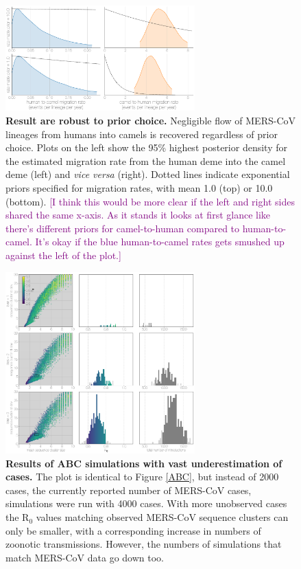 \documentclass[11pt,oneside,letterpaper]{article}
\def\tbc#1{\textcolor{purple}{[#1]}}
\begin{document}
\begin{figure}[h]
\centering
	\includegraphics[width=0.65\textwidth]{figures/mers_prior.png}
	\caption{\textbf{Result are robust to prior choice.}
Negligible flow of MERS-CoV lineages from humans into camels is recovered regardless of prior choice.
Plots on the left show the 95\% highest posterior density for the estimated migration rate from the human deme into the camel deme (left) and \textit{vice versa} (right).
Dotted lines indicate exponential priors specified for migration rates, with mean 1.0 (top) or 10.0 (bottom).
\tbc{I think this would be more clear if the left and right sides shared the same x-axis. As it stands it looks at first glance like there's different priors for camel-to-human compared to human-to-camel. It's okay if the blue human-to-camel rates gets smushed up against the left of the plot.}
	}
	\label{prior}
\end{figure}

\begin{figure}[h]
\centering
	\includegraphics[width=0.65\textwidth]{figures/mers_epi_4000c.png}
	\caption{\textbf{Results of ABC simulations with vast underestimation of cases.}
The plot is identical to Figure \ref{ABC}, but instead of 2000 cases, the currently reported number of MERS-CoV cases, simulations were run with 4000 cases.
With more unobserved cases the R$_{0}$ values matching observed MERS-CoV sequence clusters can only be smaller, with a corresponding increase in numbers of zoonotic transmissions.
However, the numbers of simulations that match MERS-CoV data go down too.
	}
	\label{extra_cases}
\end{figure}
\end{document}
